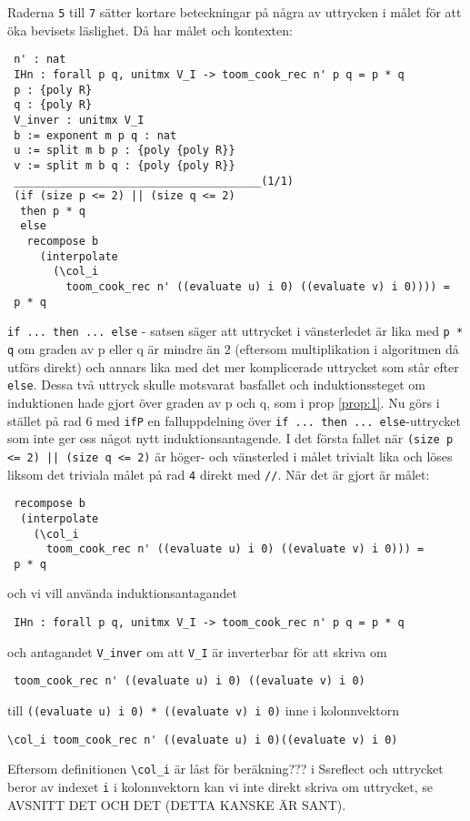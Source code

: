 Raderna \verb+5+ till \verb+7+ sätter kortare beteckningar på några av uttrycken i målet för att öka bevisets
läslighet. Då har målet och kontexten:
\begin{verbatim}
 n' : nat
 IHn : forall p q, unitmx V_I -> toom_cook_rec n' p q = p * q
 p : {poly R}
 q : {poly R}
 V_inver : unitmx V_I
 b := exponent m p q : nat
 u := split m b p : {poly {poly R}}
 v := split m b q : {poly {poly R}}
 ______________________________________(1/1)
 (if (size p <= 2) || (size q <= 2)
  then p * q
  else
   recompose b
     (interpolate
       (\col_i 
         toom_cook_rec n' ((evaluate u) i 0) ((evaluate v) i 0)))) =
 p * q
\end{verbatim}
\verb=if ... then ... else= - satsen säger att uttrycket i vänsterledet är lika med \verb+p * q+ om graden 
av p eller q är mindre än 2 (eftersom multiplikation i algoritmen då utförs direkt) och annars 
lika med det mer komplicerade uttrycket som står efter \verb+else+. Dessa två uttryck skulle motsvarat
basfallet och induktionssteget om induktionen hade gjort över graden av p och q, som i prop \ref{prop:1}.
Nu görs i stället på rad 6 med \verb=ifP= en falluppdelning över \verb=if ... then ... else=-uttrycket 
som inte ger oss något nytt induktionsantagende.
I det första fallet när \verb+(size p <= 2) || (size q <= 2)+ är höger- och vänsterled i målet trivialt lika 
och löses liksom det triviala målet på rad \verb+4+ direkt med \verb+//+. 
När det är gjort är målet:
\begin{verbatim}
 recompose b
  (interpolate 
    (\col_i 
      toom_cook_rec n' ((evaluate u) i 0) ((evaluate v) i 0))) =
 p * q
\end{verbatim}
och vi vill använda induktionsantagandet 
\begin{verbatim}
 IHn : forall p q, unitmx V_I -> toom_cook_rec n' p q = p * q
\end{verbatim}
och antagandet \verb+V_inver+ om att \verb+V_I+ är inverterbar för att skriva om 
\begin{verbatim}
 toom_cook_rec n' ((evaluate u) i 0) ((evaluate v) i 0)
\end{verbatim}
till \verb=((evaluate u) i 0) * ((evaluate v) i 0)= inne i kolonnvektorn
\begin{verbatim}
\col_i toom_cook_rec n' ((evaluate u) i 0)((evaluate v) i 0)
\end{verbatim}
Eftersom definitionen \verb=\col_i= är låst för beräkning??? i Ssreflect och uttrycket beror av
indexet \verb+i+ i kolonnvektorn kan vi inte direkt skriva om uttrycket, 
se AVSNITT DET OCH DET (DETTA KANSKE ÄR SANT).
